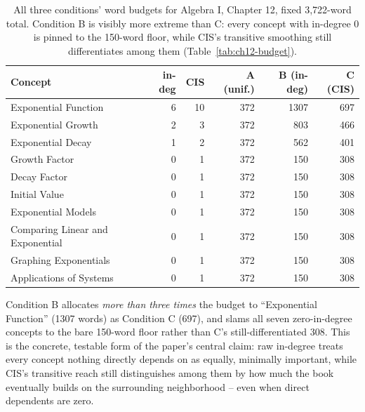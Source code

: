 \begin{table}[htbp]
\centering
\caption{All three conditions' word budgets for Algebra I, Chapter 12, fixed 3{,}722-word total. Condition B is visibly more extreme than C: every concept with in-degree 0 is pinned to the 150-word floor, while CIS's transitive smoothing still differentiates among them (Table~\ref{tab:ch12-budget}).}
\label{tab:ch12-three-conditions}
\begin{tabular}{lrr rr r}
\toprule
Concept & in-deg & CIS & A (unif.) & B (in-deg) & C (CIS) \\
\midrule
Exponential Function             & 6 & 10 & 372 & 1307 & 697 \\
Exponential Growth                & 2 & 3  & 372 & 803  & 466 \\
Exponential Decay                 & 1 & 2  & 372 & 562  & 401 \\
Growth Factor                     & 0 & 1  & 372 & 150  & 308 \\
Decay Factor                      & 0 & 1  & 372 & 150  & 308 \\
Initial Value                     & 0 & 1  & 372 & 150  & 308 \\
Exponential Models                & 0 & 1  & 372 & 150  & 308 \\
Comparing Linear and Exponential  & 0 & 1  & 372 & 150  & 308 \\
Graphing Exponentials             & 0 & 1  & 372 & 150  & 308 \\
Applications of Systems           & 0 & 1  & 372 & 150  & 308 \\
\bottomrule
\end{tabular}
\end{table}

Condition B allocates \emph{more than three times} the budget to
``Exponential Function'' (1307 words) as Condition C (697), and slams all
seven zero-in-degree concepts to the bare 150-word floor rather than C's
still-differentiated 308. This is the concrete, testable form of the paper's
central claim: raw in-degree treats every concept nothing directly depends
on as equally, minimally important, while CIS's transitive reach still
distinguishes among them by how much the book eventually builds on the
surrounding neighborhood -- even when direct dependents are zero.

